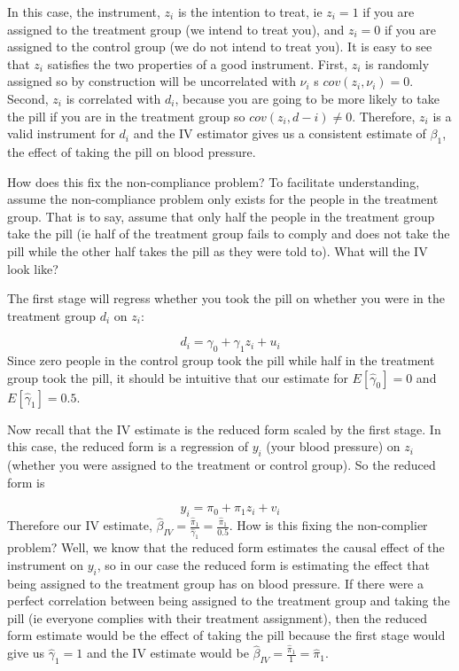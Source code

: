 \documentclass[
]{article}
\begin{document}
In this case, the instrument, \(z_i\) is the intention to treat, ie
\(z_i=1\) if you are assigned to the treatment group (we intend to treat
you), and \(z_i=0\) if you are assigned to the control group (we do not
intend to treat you). It is easy to see that \(z_i\) satisfies the two
properties of a good instrument. First, \(z_i\) is randomly assigned so
by construction will be uncorrelated with \(\nu_i\) s
\(cov(z_i,\nu_i)=0\). Second, \(z_i\) is correlated with \(d_i\),
because you are going to be more likely to take the pill if you are in
the treatment group so \(cov(z_i,d-i)\neq0\). Therefore, \(z_i\) is a
valid instrument for \(d_i\) and the IV estimator gives us a consistent
estimate of \(\beta_1\), the effect of taking the pill on blood
pressure.

How does this fix the non-compliance problem? To facilitate
understanding, assume the non-compliance problem only exists for the
people in the treatment group. That is to say, assume that only half the
people in the treatment group take the pill (ie half of the treatment
group fails to comply and does not take the pill while the other half
takes the pill as they were told to). What will the IV look like?

The first stage will regress whether you took the pill on whether you
were in the treatment group \(d_i\) on \(z_i\):

\[
d_i=\gamma_0+\gamma_1z_i+u_i
\] Since zero people in the control group took the pill while half in
the treatment group took the pill, it should be intuitive that our
estimate for \(E[\hat{\gamma}_0]=0\) and \(E[\hat{\gamma}_1]=0.5\).

Now recall that the IV estimate is the reduced form scaled by the first
stage. In this case, the reduced form is a regression of \(y_i\) (your
blood pressure) on \(z_i\)(whether you were assigned to the treatment or
control group). So the reduced form is

\[
y_i=\pi_0+\pi_1z_i+v_i
\] Therefore our IV estimate,
\(\hat{\beta}_{IV}=\frac{\hat{\pi}_1}{\hat{\gamma}_1}=\frac{\hat{\pi}_1}{0.5}\).
How is this fixing the non-complier problem? Well, we know that the
reduced form estimates the causal effect of the instrument on \(y_i\),
so in our case the reduced form is estimating the effect that being
assigned to the treatment group has on blood pressure. If there were a
perfect correlation between being assigned to the treatment group and
taking the pill (ie everyone complies with their treatment assignment),
then the reduced form estimate would be the effect of taking the pill
because the first stage would give us \(\hat{\gamma}_1=1\) and the IV
estimate would be
\(\hat{\beta}_{IV}=\frac{\hat{\pi}_1}{1}=\hat{\pi}_1\).
\end{document}
